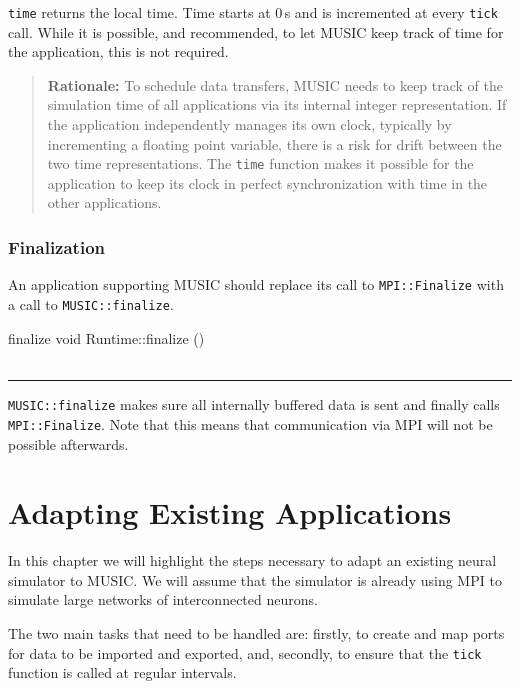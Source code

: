 \documentclass[a4paper,twoside]{report}
\makeatletter
\newenvironment{rationale}%
{\par\begin{quote}\textbf{Rationale:}}%
{\par\end{quote}}
\newenvironment{parameters}%
{\begin{tabular}{@{\hspace{2em}}lp{0.6\textwidth}}}%
{\end{tabular}\par\vspace{1mm}\par\hrule\par\vspace{5mm}}
\makeatother
\begin{document}
\lstinline|time| returns the local time.  Time starts at 0\,s and is
incremented at every \lstinline|tick| call.  While it is possible, and
recommended, to let MUSIC keep track of time for the application, this
is not required.

\begin{rationale}
  To schedule data transfers, MUSIC needs to keep track of the
  simulation time of all applications via its internal integer
  representation.  If the application independently manages its own
  clock, typically by incrementing a floating point variable, there is
  a risk for drift between the two time representations.  The
  \lstinline|time| function makes it possible for the application to
  keep its clock in perfect synchronization with time in the other
  applications.
\end{rationale}


\subsection{Finalization}

An application supporting MUSIC should replace its call to
\lstinline|MPI::Finalize| with a call to \lstinline|MUSIC::finalize|.

\begin{head}{finalize}
  void Runtime::finalize ()
\end{head}
\begin{parameters}
\end{parameters}

\lstinline|MUSIC::finalize| makes sure all internally buffered data is
sent and finally calls \lstinline|MPI::Finalize|.  Note that this
means that communication via MPI will not be possible afterwards.


\chapter{Adapting Existing Applications}

In this chapter we will highlight the steps necessary to adapt an
existing neural simulator to MUSIC.  We will assume that the simulator
is already using MPI to simulate large networks of interconnected
neurons.

The two main tasks that need to be handled are: firstly, to create and
map ports for data to be imported and exported, and, secondly, to
ensure that the \lstinline|tick| function is called at regular
intervals.
\end{document}

